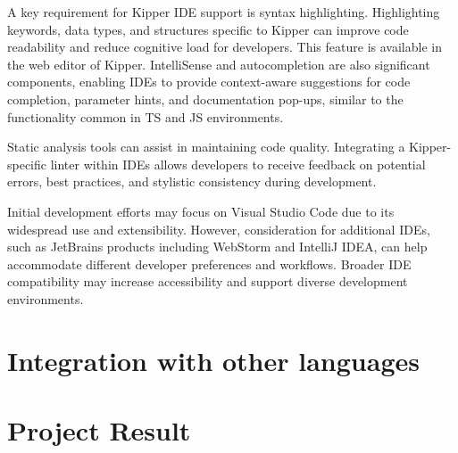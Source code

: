 A key requirement for Kipper IDE support is syntax highlighting. Highlighting keywords, data types, and structures specific to Kipper can improve code readability and reduce cognitive load for developers. This feature is available in the web editor of Kipper. IntelliSense and autocompletion are also significant components, enabling IDEs to provide context-aware suggestions for code completion, parameter hints, and documentation pop-ups, similar to the functionality common in TS and JS environments.

Static analysis tools can assist in maintaining code quality. Integrating a Kipper-specific linter within IDEs allows developers to receive feedback on potential errors, best practices, and stylistic consistency during development.

Initial development efforts may focus on Visual Studio Code due to its widespread use and extensibility. However, consideration for additional IDEs, such as JetBrains products including WebStorm and IntelliJ IDEA, can help accommodate different developer preferences and workflows. Broader IDE compatibility may increase accessibility and support diverse development environments.

\section{Integration with other languages}

\section{Project Result}

